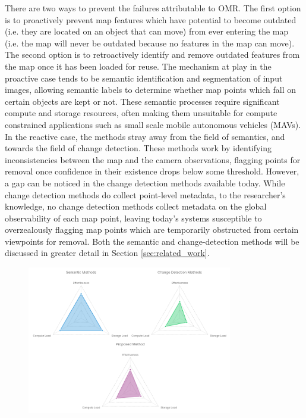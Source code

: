 There are two ways to prevent the failures attributable to OMR. The first option is to proactively prevent map features which have potential to become outdated (i.e. they are located on an object that can move) from ever entering the map (i.e. the map will never be outdated because no features in the map can move). The second option is to retroactively identify and remove outdated features from the map once it has been loaded for reuse. The mechanism at play in the proactive case tends to be semantic identification and segmentation of input images, allowing semantic labels to determine whether map points which fall on certain objects are kept or not. These semantic processes require significant compute and storage resources, often making them unsuitable for compute constrained applications such as small scale mobile autonomous vehicles (MAVs). In the reactive case, the methods stray away from the field of semantics, and towards the field of change detection. These methods work by identifying inconsistencies between the map and the camera observations, flagging points for removal once confidence in their existence drops below some threshold. However, a gap can be noticed in the change detection methods available today. While change detection methods do collect point-level metadata, to the researcher's knowledge, no change detection methods collect metadata on the global observability of each map point, leaving today's systems susceptible to overzealously flagging map points which are temporarily obstructed from certain viewpoints for removal. Both the semantic and change-detection methods will be discussed in greater detail in Section \ref{sec:related_work}.

\begin{figure}[htbp]
    \centering
    \includegraphics[width=0.8\textwidth]{resources/omr_method_comparison.png}
    \caption{}
    \label{fig:omr_method_comparison}
\end{figure}

